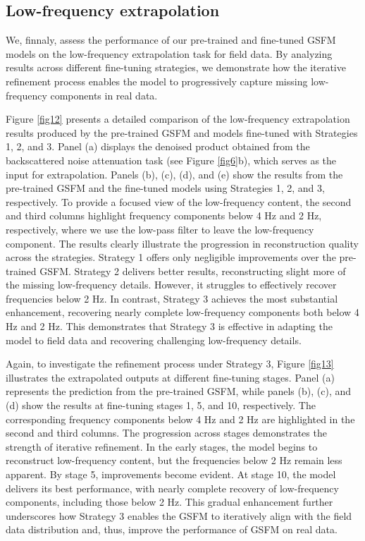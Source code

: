 \subsection{Low-frequency extrapolation}
We, finnaly, assess the performance of our pre-trained and fine-tuned GSFM models on the low-frequency extrapolation task for field data. By analyzing results across different fine-tuning strategies, we demonstrate how the iterative refinement process enables the model to progressively capture missing low-frequency components in real data. 

Figure \ref{fig12} presents a detailed comparison of the low-frequency extrapolation results produced by the pre-trained GSFM and models fine-tuned with Strategies 1, 2, and 3. Panel (a) displays the denoised product obtained from the backscattered noise attenuation task (see Figure \ref{fig6}b), which serves as the input for extrapolation. Panels (b), (c), (d), and (e) show the results from the pre-trained GSFM and the fine-tuned models using Strategies 1, 2, and 3, respectively. To provide a focused view of the low-frequency content, the second and third columns highlight frequency components below 4 Hz and 2 Hz, respectively, where we use the low-pass filter to leave the low-frequency component. The results clearly illustrate the progression in reconstruction quality across the strategies. Strategy 1 offers only negligible improvements over the pre-trained GSFM. Strategy 2 delivers better results, reconstructing slight more of the missing low-frequency details. However, it struggles to effectively recover frequencies below 2 Hz. In contrast, Strategy 3 achieves the most substantial enhancement, recovering nearly complete low-frequency components both below 4 Hz and 2 Hz. This demonstrates that Strategy 3 is effective in adapting the model to field data and recovering challenging low-frequency details. 

Again, to investigate the refinement process under Strategy 3, Figure \ref{fig13} illustrates the extrapolated outputs at different fine-tuning stages. Panel (a) represents the prediction from the pre-trained GSFM, while panels (b), (c), and (d) show the results at fine-tuning stages 1, 5, and 10, respectively. The corresponding frequency components below 4 Hz and 2 Hz are highlighted in the second and third columns. The progression across stages demonstrates the strength of iterative refinement. In the early stages, the model begins to reconstruct low-frequency content, but the frequencies below 2 Hz remain less apparent. By stage 5, improvements become evident. At stage 10, the model delivers its best performance, with nearly complete recovery of low-frequency components, including those below 2 Hz. This gradual enhancement further underscores how Strategy 3 enables the GSFM to iteratively align with the field data distribution and, thus, improve the performance of GSFM on real data. 

